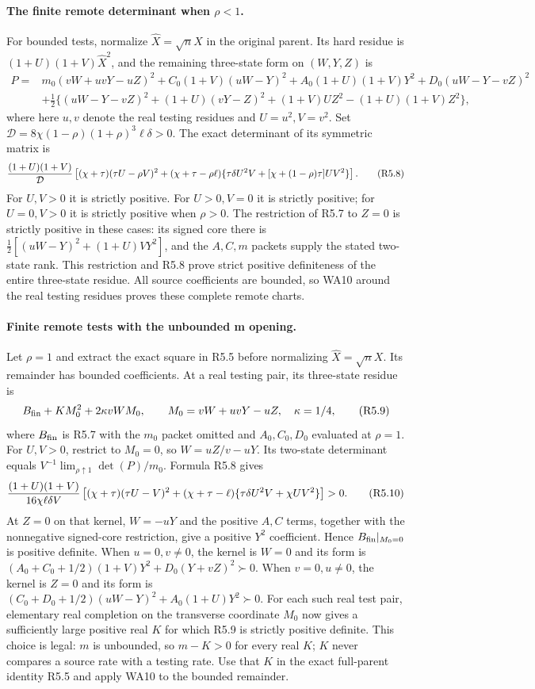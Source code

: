 \paragraph{The finite remote determinant when $\rho<1$.}
For bounded tests, normalize $\widehat X=\sqrt nX$ in the original
parent. Its hard residue is $(1+U)(1+V)\widehat X^2$, and the remaining
three-state form on $(W,Y,Z)$ is
\[
\begin{split}
 P={}&m_0(vW+uvY-uZ)^2+C_0(1+V)(uW-Y)^2
   +A_0(1+U)(1+V)Y^2+D_0(uW-Y-vZ)^2\\
 &+\tfrac12\{(uW-Y-vZ)^2+(1+U)(vY-Z)^2
        +(1+V)U Z^2-(1+U)(1+V)Z^2\},                
\end{split}\tag{R5.7}
\]
where here $u,v$ denote the real testing residues and $U=u^2,V=v^2$.
Set
$\mathcal D=8\chi(1-\rho)(1+\rho)^3\ell\delta>0$.
The exact determinant of its symmetric matrix is
\[
 { (1+U)(1+V)\over\mathcal D}
 \left[(\chi+\tau)(\tau U-\rho V)^2
 +(\chi+\tau-\rho\ell)
 \{\tau\delta U^2V+[\chi+(1-\rho)\tau]UV^2\}\right]. \tag{R5.8}
\]
For $U,V>0$ it is strictly positive. For $U>0,V=0$ it is strictly
positive; for $U=0,V>0$ it is strictly positive when $\rho>0$.
The restriction of R5.7 to $Z=0$ is strictly positive in these cases:
its signed core there is
$\tfrac12[(uW-Y)^2+(1+U)VY^2]$, and the $A,C,m$ packets supply
the stated two-state rank. This restriction and R5.8 prove strict
positive definiteness of the entire three-state residue. All source
coefficients are bounded, so WA10 around the real testing residues
proves these complete remote charts.

\paragraph{Finite remote tests with the unbounded m opening.}
Let $\rho=1$ and extract the exact square in R5.5 before normalizing
$\widehat X=\sqrt nX$. Its remainder has bounded coefficients.
At a real testing pair, its three-state residue is
\[
 B_{\rm fin}+K M_0^2+2\kappa vW M_0,\qquad
 M_0=vW+uvY-uZ,\quad\kappa=1/4,                     \tag{R5.9}
\]
where $B_{\rm fin}$ is R5.7 with the $m_0$ packet omitted and
$A_0,C_0,D_0$ evaluated at $\rho=1$.
For $U,V>0$, restrict to $M_0=0$, so $W=uZ/v-uY$.
Its two-state determinant equals $V^{-1}\lim_{\rho\uparrow1}
\det(P)/m_0$. Formula R5.8 gives
\[
 { (1+U)(1+V)\over16\chi\ell\delta V}
 \left[(\chi+\tau)(\tau U-V)^2
 +(\chi+\tau-\ell)\{\tau\delta U^2V+\chi UV^2\}\right]>0.\tag{R5.10}
\]
At $Z=0$ on that kernel, $W=-uY$ and the positive $A,C$ terms,
together with the nonnegative signed-core restriction, give a positive
$Y^2$ coefficient. Hence $B_{\rm fin}|_{M_0=0}$ is positive definite.
When $u=0,v\ne0$, the kernel is $W=0$ and its form is
$(A_0+C_0+1/2)(1+V)Y^2+D_0(Y+vZ)^2\succ0$.
When $v=0,u\ne0$, the kernel is $Z=0$ and its form is
$(C_0+D_0+1/2)(uW-Y)^2+A_0(1+U)Y^2\succ0$.
For each such real test pair, elementary real completion on the
transverse coordinate $M_0$ now gives a sufficiently large positive
real $K$ for which R5.9 is strictly positive definite. This choice is
legal: $m$ is unbounded, so $m-K>0$ for every real $K$; $K$ never
compares a source rate with a testing rate. Use that $K$ in the exact
full-parent identity R5.5 and apply WA10 to the bounded remainder.

